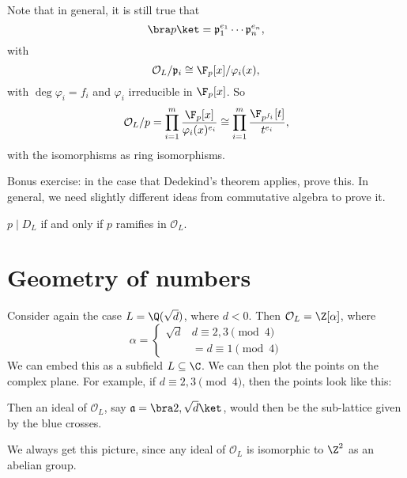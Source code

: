 \documentclass[a4paper]{article}
\begin{document}
Note that in general, it is still true that
\[
  \bra p\ket = \mathfrak{p}_1^{e_1} \cdots \mathfrak{p}_n^{e_n},
\]
with
\[
  \mathcal{O}_L/\mathfrak{p}_i \cong \F_p[x] / \varphi_i(x),
\]
with $\deg \varphi_i = f_i$ and $\varphi_i$ irreducible in $\F_p[x]$. So
\[
  \mathcal{O}_L/p = \prod_{i = 1}^m \frac{\F_p[x]}{\varphi_i(x)^{e_i}} \cong \prod_{i = 1}^m \frac{\F_{p^{f_i}}[t]}{t^{e_i}},
\]
with the isomorphisms as ring isomorphisms.

Bonus exercise: in the case that Dedekind's theorem applies, prove this. In general, we need slightly different ideas from commutative algebra to prove it.

\begin{thm}
  $p \mid D_L$ if and only if $p$ ramifies in $\mathcal{O}_L$.
\end{thm}

\section{Geometry of numbers}
Consider again the case $L = \Q(\sqrt{d})$, where $d < 0$. Then $\mathcal{O}_L = \Z[\alpha]$, where
\[
  \alpha =
  \begin{cases}
    \sqrt{d} & d \equiv 2, 3\pmod 4\\
    &= d \equiv 1 \pmod 4
  \end{cases}
\]
We can embed this as a subfield $L \subseteq \C$. We can then plot the points on the complex plane. For example, if $d \equiv 2, 3 \pmod 4$, then the points look like this:
\begin{center}
\end{center}
Then an ideal of $\mathcal{O}_L$, say $\mathfrak{a} = \bra 2, \sqrt{d}\ket$, would then be the sub-lattice given by the blue crosses.
\begin{center}
\end{center}
We always get this picture, since any ideal of $\mathcal{O}_L$ is isomorphic to $\Z^2$ as an abelian group.
\end{document}
